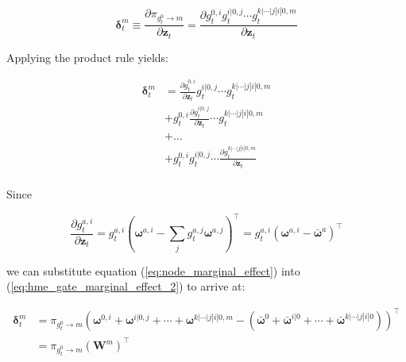 \documentclass[12pt]{article}
\newcommand{\bw}[1]{\boldsymbol{\omega}^{#1}}
\newcommand{\mean}[1]{\bar{#1}}
\newcommand{\gateprod}[2]{\pi_{#1 \longrightarrow #2}}
\begin{document}
\begin{equation} \label{eq:hme_gate_marginal_effect_1}
  \boldsymbol{\delta}^{m}_{t} \equiv \frac{\partial \gateprod{g^{0}_{t}}{m}}{\partial \boldsymbol{z}_{t}} = \frac{\partial g^{0, i}_{t} g^{i|0, j}_{t} \cdots g^{k|\cdots|j|i|0, m}_{t}}{\partial \boldsymbol{z}_{t}}
\end{equation}

Applying the product rule yields:

\begin{equation} \label{eq:hme_gate_marginal_effect_2}
  \begin{split}
    \boldsymbol{\delta}^{m}_{t} &= \frac{\partial g^{0, i}_{t}}{\partial \boldsymbol{z}_{t}} g^{i|0, j}_{t} \cdots g^{k|\cdots|j|i|0, m}_{t}                       \\
                                     &+ g^{0, i}_{t} \frac{\partial g^{i|0, j}_{t}}{\partial \boldsymbol{z}_{t}} \cdots g^{k|\cdots|j|i|0, m}_{t} \\
                                     &+ \dots                                                                                     \\
                                     &+ g^{0, i}_{t} g^{i|0, j}_{t} \cdots \frac{\partial g^{k|\cdots|j|i|0, m}_{t}}{\partial \boldsymbol{z}_{t}} \\
  \end{split}
\end{equation}

Since

\begin{equation} \label{eq:node_marginal_effect}
  \frac{\partial g^{a, i}_{t}}{\partial \boldsymbol{z}_{t}} = g^{a, i}_{t} \left( \bw{a, i} - \sum_{j} g^{a, j}_{t} \bw{a, j} \right)^{\top} = g^{a, i}_{t} \left( \bw{a, i} - \mean{\boldsymbol{\omega}}^{a} \right)^{\top}
\end{equation}

we can substitute equation (\ref{eq:node_marginal_effect}) into
(\ref{eq:hme_gate_marginal_effect_2}) to arrive at:

\begin{equation} \label{eq:marginal_effects}
  \begin{split}
    \boldsymbol{\delta}^{m}_{t} &= \gateprod{g^{0}_{t}}{m} \left(\boldsymbol{\omega}^{0, i} + \boldsymbol{\omega}^{i|0, j} + \cdots + \boldsymbol{\omega}^{k|\cdots|j|i|0, m} - \left( \mean{\boldsymbol{\omega}}^{0} + \mean{\boldsymbol{\omega}}^{i|0} + \cdots + \mean{\boldsymbol{\omega}}^{k|\cdots|j|i|0} \right) \right)^{\top} \\
                                &= \gateprod{g^{0}_{t}}{m} ( \boldsymbol{W}^{m} )^{\top}
  \end{split}
\end{equation}
\end{document}
